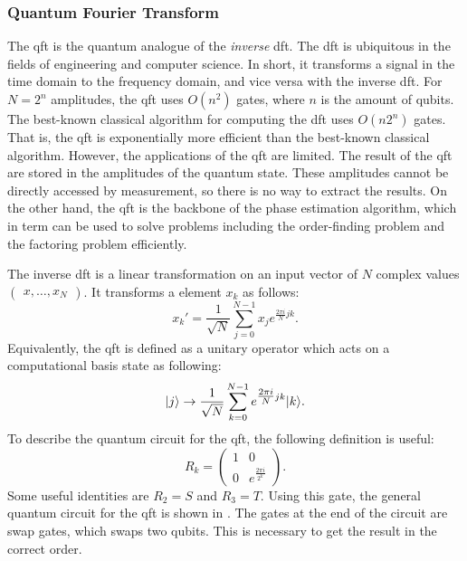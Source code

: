 \subsubsection{Quantum Fourier Transform}
The \gls{qft} is the quantum analogue of the \emph{inverse} \gls{dft}.
The \gls{dft} is ubiquitous in the fields of engineering and computer science.
In short, it transforms a signal in the time domain to the frequency domain, and vice versa with the inverse \gls{dft}.
For $N = 2^n$ amplitudes, the \gls{qft} uses $O(n^2)$ gates, where $n$ is the amount of qubits.
The best-known classical algorithm for computing the \gls{dft} uses $O(n2^n)$ gates.
That is, the \gls{qft} is exponentially more efficient than the best-known classical algorithm.
However, the applications of the \gls{qft} are limited.
The result of the \gls{qft} are stored in the amplitudes of the quantum state.
These amplitudes cannot be directly accessed by measurement, so there is no way to extract the results.
On the other hand, the \gls{qft} is the backbone of the phase estimation algorithm, which in term can be used to solve problems including the order-finding problem and the factoring problem efficiently.

The inverse \gls{dft} is a linear transformation on an input vector of $N$ complex values $(\begin{matrix}x,\ldots,x_N\end{matrix})$.
It transforms a element $x_k$ as follows:
\begin{equation}
x_k' = \dfrac{1}{\sqrt{N}} \sum_{j=0}^{N-1} x_j e^{\tfrac{2\pi i}{N}jk}.
\end{equation}
Equivalently, the \gls{qft} is defined as a unitary operator which acts on a computational basis state  as following:
\begin{equation}
\vert{j}\rangle \rightarrow \dfrac{1}{\sqrt N}\sum_{k=0}^{N-1}e^{\tfrac{2\pi i}{N} jk}\vert{k}\rangle.
\end{equation}
To describe the quantum circuit for the \gls{qft}, the following definition is useful:
\begin{equation}
R_k = \begin{pmatrix}
1 & 0 \\
0 & e^{\tfrac{2\pi i}{2^k}}
\end{pmatrix}.
\end{equation}
Some useful identities are $R_2 = S$ and $R_3 = T$.
Using this gate, the general quantum circuit for the \gls{qft} is shown in .
The gates at the end of the circuit are swap gates, which swaps two qubits.
This is necessary to get the result in the correct order.

